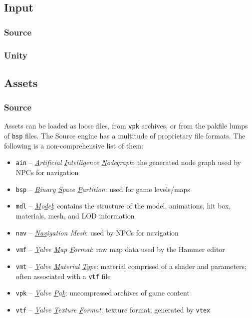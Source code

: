 \documentclass[a4paper, 12pt]{scrartcl}
\begin{document}
\subsection{Input}
\subsubsection{Source}
\subsubsection{Unity}

\subsection{Assets}
\subsubsection{Source}
Assets can be loaded as loose files, from \texttt{vpk} archives, or from the pakfile lumps of \texttt{bsp} files. The Source engine has a multitude of proprietary file formats. The following is a non-comprehensive list of them:

\begin{itemize}
  \item \texttt{ain} -- \textit{\underline{A}rtificial \underline{I}ntelligence \underline{N}odegraph}: the generated node graph used by NPCs for navigation
  \item \texttt{bsp} -- \textit{\underline{B}inary \underline{S}pace \underline{P}artition}: used for game levels/maps
  \item \texttt{mdl} -- \textit{\underline{M}o\underline{d}e\underline{l}}: contains the structure of the model, animations, hit box, materials, mesh, and LOD information
  \item \texttt{nav} -- \textit{\underline{Nav}igation Mesh}: used by NPCs for navigation
  \item \texttt{vmf} -- \textit{\underline{V}alve \underline{M}ap \underline{F}ormat}: raw map data used by the Hammer editor
  \item \texttt{vmt} -- \textit{\underline{V}alve \underline{M}aterial \underline{T}ype}: material comprised of a shader and parameters; often associated with a \texttt{vtf} file
  \item \texttt{vpk} -- \textit{\underline{V}alve \underline{P}a\underline{k}}: uncompressed archives of game content
  \item \texttt{vtf} -- \textit{\underline{V}alve \underline{T}exture \underline{F}ormat}: texture format; generated by \texttt{vtex}
\end{itemize}
\end{document}
